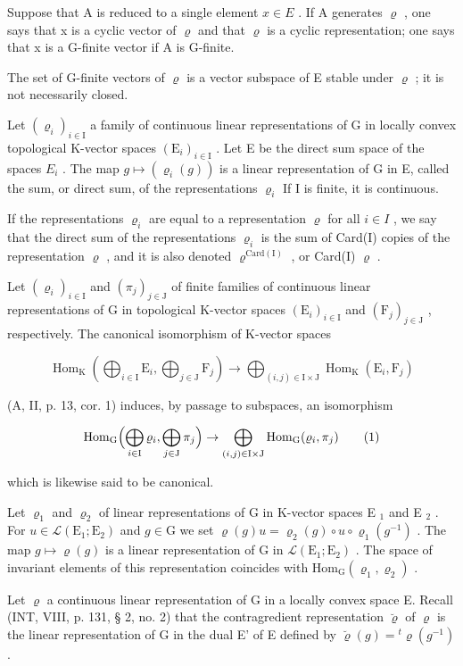 Suppose that A is reduced to a single element \(x \in E\) . If A generates \(\varrho\) , one says that x is a cyclic vector of \(\varrho\) and that \(\varrho\) is a cyclic representation; one says that x is a G-finite vector if A is G-finite.

The set of G-finite vectors of \(\varrho\) is a vector subspace of E stable under \(\varrho\) ; it is not necessarily closed.

Let \((\varrho_{i})_{i\in\mathrm{I}}\) a family of continuous linear representations of G in locally convex topological K-vector spaces \((\mathrm{E}_{i})_{i\in\mathrm{I}}\) . Let E be the direct sum space of the spaces \(E_{i}\) . The map \(g\mapsto(\varrho_{i}(g))\) is a linear representation of G in E, called the sum, or direct sum, of the representations \(\varrho_{i}\) If I is finite, it is continuous.

If the representations \(\varrho_{i}\) are equal to a representation \(\varrho\) for all \(i \in I\) , we say that the direct sum of the representations \(\varrho_{i}\) is the sum of Card(I) copies of the representation \(\varrho\) , and it is also denoted \(\varrho^{\mathrm{Card(I)}}\) , or Card(I) \(\varrho\) .

Let \((\varrho_{i})_{i\in\mathrm{I}}\) and \((\pi_{j})_{j\in\mathrm{J}}\) of finite families of continuous linear representations of G in topological K-vector spaces \((\mathrm{E}_{i})_{i\in\mathrm{I}}\) and \((\mathrm{F}_{j})_{j\in\mathrm{J}}\) , respectively. The canonical isomorphism of K-vector spaces

\[
\operatorname{Hom} _ {\mathrm{K}} \left(\bigoplus_ {i \in \mathrm{I}} \mathrm{E} _ {i}, \bigoplus_ {j \in \mathrm{J}} \mathrm{F} _ {j}\right)\rightarrow \bigoplus_ {(i, j) \in \mathrm{I} \times \mathrm{J}} \operatorname{Hom} _ {\mathrm{K}} (\mathrm{E} _ {i}, \mathrm{F} _ {j})
\]

(A, II, p. 13, cor. 1) induces, by passage to subspaces, an isomorphism

\[
\mathrm{Hom} _ {\mathrm{G}} \Bigl (\bigoplus_ {i \in \mathrm{I}} \varrho_ {i}, \bigoplus_ {j \in \mathrm{J}} \pi_ {j} \Bigr) \to \bigoplus_ {(i, j) \in \mathrm{I} \times \mathrm{J}} \mathrm{Hom} _ {\mathrm{G}} (\varrho_ {i}, \pi_ {j})\tag{1}
\]

which is likewise said to be canonical.

Let \(\varrho_{1}\) and \(\varrho_{2}\) of linear representations of G in K-vector spaces E \(_{1}\) and E \(_{2}\) . For \(u \in \mathcal{L}(\mathrm{E}_{1};\mathrm{E}_{2})\) and \(g \in \mathrm{G}\) we set \(\varrho(g)u = \varrho_{2}(g) \circ u \circ \varrho_{1}(g^{-1})\) . The map \(g \mapsto \varrho(g)\) is a linear representation of G in \(\mathcal{L}(\mathrm{E}_{1};\mathrm{E}_{2})\) . The space of invariant elements of this representation coincides with \(\mathrm{Hom}_{\mathrm{G}}(\varrho_{1},\varrho_{2})\) .

Let \(\varrho\) a continuous linear representation of G in a locally convex space E. Recall (INT, VIII, p. 131, § 2, no. 2) that the contragredient representation \(\breve{\varrho}\) of \(\varrho\) is the linear representation of G in the dual E' of E defined by \(\breve{\varrho}(g) = {}^{t} \varrho(g^{-1})\) .

